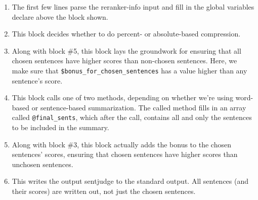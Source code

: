 \documentclass[10pt]{article}
\begin{document}
\begin{enumerate}
\item The first few lines parse the reranker-info input
  and fill in the global variables declare above the
  block shown.
\item This block decides whether to do percent-
  or absolute-based compression.
\item Along with block \#5, this block lays the groundwork
  for ensuring that all chosen sentences have higher scores
  than non-chosen sentences.  Here, we make sure that
  \verb|$bonus_for_chosen_sentences| has a value higher than
  any sentence's score. 
\item This block calls one of two methods, depending on
  whether we're using word-based or sentence-based 
  summarization.  The called method fills in an array
  called \verb|@final_sents|, which after the call, contains
  all and only the sentences to be included in the summary.
\item Along with block \#3, this block actually adds the
  bonus to the chosen sentences' scores, ensuring that
  chosen sentences have higher scores than unchosen sentences.
\item This writes the output sentjudge to the standard 
  output.  All sentences (and their scores) are written
  out, not just the chosen sentences.
\end{enumerate}
\end{document}
